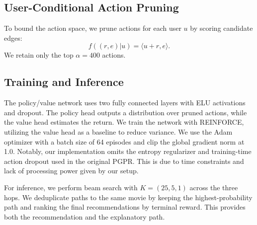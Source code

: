 \documentclass{article}
\begin{document}
\subsection{User-Conditional Action Pruning}
To bound the action space, we prune actions for each user $u$ by scoring candidate edges:
\begin{equation}
    f((r, e) | u) = \langle u + r, e \rangle .
\end{equation}
We retain only the top $\alpha=400$ actions.

\subsection{Training and Inference}
The policy/value network uses two fully connected layers with ELU activations and dropout. The policy head outputs a distribution over 
pruned actions, while the value head estimates the return. We train the network with REINFORCE, utilizing the value head as a baseline to reduce variance. 
We use the Adam optimizer with a batch size of 64 episodes and clip the global gradient norm at 1.0. Notably, our implementation omits the entropy regularizer 
and training-time action dropout used in the original PGPR. This is due to time constraints and lack of processing power given by our setup.

For inference, we perform beam search with $K=(25, 5, 1)$ across the three hops. We deduplicate paths to the same movie by keeping the 
highest-probability path and ranking the final recommendations by terminal reward. This provides both the recommendation and the explanatory path.

\newpage

\end{document}
